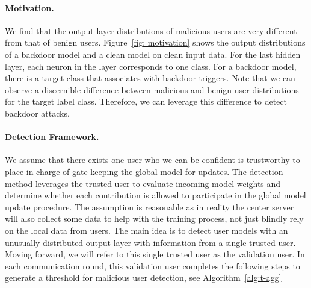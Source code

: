 \documentclass{article} %
\newcommand{\yli}[1]{{\color{cyan}#1}}
\begin{document}
\vspace{-10pt}
\paragraph{Motivation.}
We find that the output layer distributions of malicious users are very different from that of benign users. Figure~\ref{fig: motivation} shows the output distributions of a backdoor model and a clean model on clean input data. For the last hidden layer, each neuron in the layer corresponds to one class. For a backdoor model, there is a target class that associates with backdoor triggers.
Note that we can observe a discernible difference between malicious and benign user distributions for the target label class. Therefore, we can leverage this difference to detect backdoor attacks.

\vspace{-10pt}
\paragraph{Detection Framework.}
We assume that there exists one user who we can be confident is trustworthy to place in charge of gate-keeping the global model for updates. The detection method leverages the trusted user to evaluate incoming model weights and determine whether each contribution is allowed to participate in the global model update procedure. \yli{The assumption is reasonable as in reality the center server will also collect some data to help with the training process, not just blindly rely on the local data from users.} 
The main idea is to detect user models with an unusually distributed output layer with information from a single trusted user. Moving forward, we will refer to this single trusted user as the validation user. In each communication round, this validation user completes the following steps to generate a threshold for malicious user detection, see Algorithm~\ref{alg:t-agg}
\end{document}
